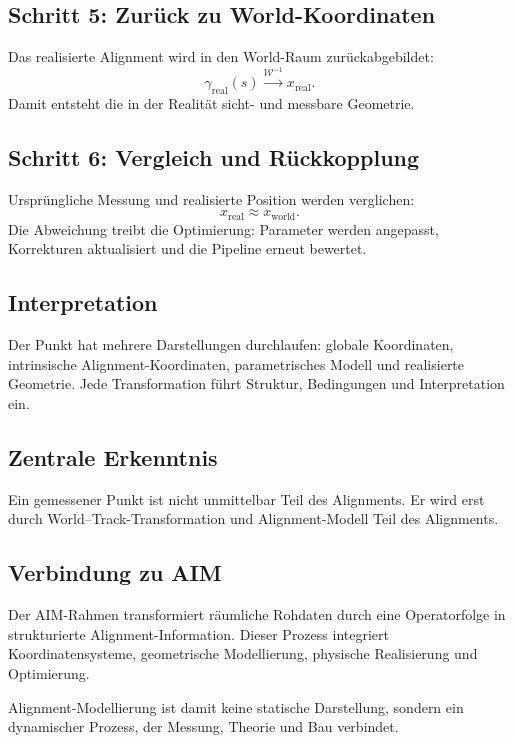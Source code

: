 \subsection{Schritt 5: Zurück zu World-Koordinaten}
Das realisierte Alignment wird in den World-Raum zurückabgebildet:
\[
\gamma_{\mathrm{real}}(s)\xrightarrow{\mathcal W^{-1}}x_{\mathrm{real}}.
\]
Damit entsteht die in der Realität sicht- und messbare Geometrie.

\subsection{Schritt 6: Vergleich und Rückkopplung}
Ursprüngliche Messung und realisierte Position werden verglichen:
\[
x_{\mathrm{real}}\approx x_{\mathrm{world}}.
\]
Die Abweichung treibt die Optimierung: Parameter werden angepasst,
Korrekturen aktualisiert und die Pipeline erneut bewertet.

\subsection{Interpretation}
Der Punkt hat mehrere Darstellungen durchlaufen: globale Koordinaten,
intrinsische Alignment-Koordinaten, parametrisches Modell und realisierte
Geometrie. Jede Transformation führt Struktur, Bedingungen und Interpretation
ein.

\subsection{Zentrale Erkenntnis}
\begin{proposition}
Ein gemessener Punkt ist nicht unmittelbar Teil des Alignments. Er wird erst
durch World--Track-Transformation und Alignment-Modell Teil des Alignments.
\end{proposition}

\subsection{Verbindung zu AIM}
\begin{summary}
Der AIM-Rahmen transformiert räumliche Rohdaten durch eine Operatorfolge in
strukturierte Alignment-Information. Dieser Prozess integriert
Koordinatensysteme, geometrische Modellierung, physische Realisierung und
Optimierung.

Alignment-Modellierung ist damit keine statische Darstellung, sondern ein
dynamischer Prozess, der Messung, Theorie und Bau verbindet.
\end{summary}
